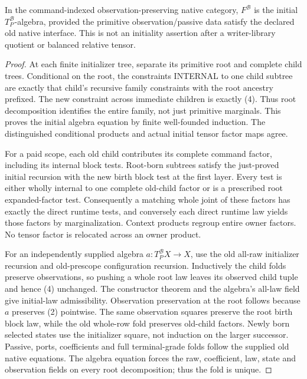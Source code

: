 \documentclass[11pt]{article}
\begin{document}
\begin{theorem}
In the command-indexed observation-preserving native category, $F^{\mathcal B}$ is the initial $T_P^{\mathcal B}$-algebra, provided the primitive observation/passive data satisfy the declared old native interface. This is not an initiality assertion after a writer-library quotient or balanced relative tensor.
\end{theorem}
\begin{proof}
At each finite initializer tree, separate its primitive root and complete child trees. Conditional on the root, the constraints INTERNAL to one child subtree are exactly that child's recursive family constraints with the root ancestry prefixed. The new constraint across immediate children is exactly (4). Thus root decomposition identifies the entire family, not just primitive marginals. This proves the initial algebra equation by finite well-founded induction. The distinguished conditional products and actual initial tensor factor maps agree.

For a paid scope, each old child contributes its complete command factor, including its internal block tests. Root-born subtrees satisfy the just-proved initial recursion with the new birth block test at the first layer. Every test is either wholly internal to one complete old-child factor or is a prescribed root expanded-factor test. Consequently a matching whole joint of these factors has exactly the direct runtime tests, and conversely each direct runtime law yields those factors by marginalization. Context products regroup entire owner factors. No tensor factor is relocated across an owner product.

For an independently supplied algebra $a:T_P^{\mathcal B}X\to X$, use the old all-raw initializer recursion and old-prescope configuration recursion. Inductively the child folds preserve observations, so pushing a whole root law leaves its observed child tuple and hence (4) unchanged. The constructor theorem and the algebra's all-law field give initial-law admissibility. Observation preservation at the root follows because $a$ preserves (2) pointwise. The same observation squares preserve the root birth block law, while the old whole-row fold preserves old-child factors. Newly born selected states use the initializer square, not induction on the larger successor. Passive, ports, coefficients and full terminal-grade folds follow the supplied old native equations. The algebra equation forces the raw, coefficient, law, state and observation fields on every root decomposition; thus the fold is unique.\end{proof}
\end{document}
